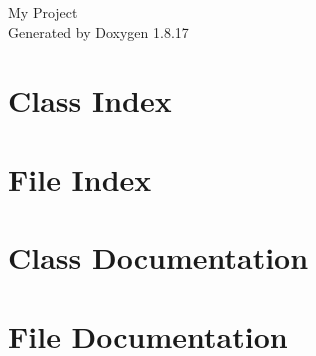 \let\mypdfximage\pdfximage\def\pdfximage{\immediate\mypdfximage}\documentclass[twoside]{book}
\newcommand{\+}{\discretionary{\mbox{\scriptsize$\hookleftarrow$}}{}{}}
\newcommand{\clearemptydoublepage}{%
  \newpage{\pagestyle{empty}\cleardoublepage}%
}
\begin{document}
\hypersetup{pageanchor=false,
             bookmarksnumbered=true,
             pdfencoding=unicode
            }
\begin{titlepage}
\vspace*{7cm}
\begin{center}%
{\Large My Project }\\
\vspace*{1cm}
{\large Generated by Doxygen 1.8.17}\\
\end{center}
\end{titlepage}
\clearemptydoublepage
{}
\tableofcontents
\clearemptydoublepage
{}
\hypersetup{pageanchor=true}

\chapter{Class Index}

\chapter{File Index}

\chapter{Class Documentation}



\chapter{File Documentation}









\backmatter
\newpage
{}
\clearemptydoublepage
{}
\printindex
\end{document}
